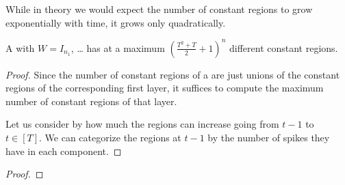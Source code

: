 While in theory we would expect the number of constant regions to grow exponentially with time, it grows only quadratically.

\begin{theorem}
A \dtlifsnn with \(W=I_{n_1}\), … has at a maximum \((\frac{T^2+T}{2}+1)^n\) different constant regions.
\end{theorem}

\begin{proof}
  Since the number of constant regions of a \dtlifsnn are just unions of the constant regions of the corresponding first layer, it suffices to compute the maximum number of constant regions of that layer.

  Let us consider by how much the regions can increase going from \(t-1\) to \(t∈[T]\). We can categorize the regions at \(t-1\) by the number of spikes they have in each component.
\end{proof}

\begin{corollary}
\end{corollary}

\begin{proof}
\end{proof}
